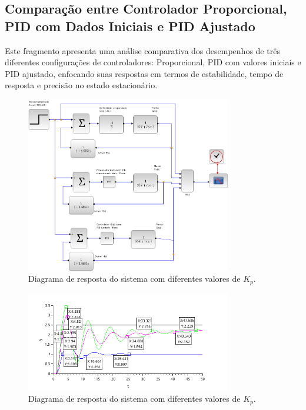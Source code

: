 \subsection{Comparação entre Controlador Proporcional, PID com Dados Iniciais e PID Ajustado}
Este fragmento apresenta uma análise comparativa dos desempenhos de três diferentes configurações de controladores: Proporcional, PID com valores iniciais e PID ajustado, enfocando suas respostas em termos de estabilidade, tempo de resposta e precisão no estado estacionário.



\begin{figure}[H]
    \centering
    \includegraphics[width=0.8\textwidth]{6-atividade/assets/d/diagrama-comparacao-proporcional-pid-pid-ajustado.png}
    \caption{Diagrama de resposta do sistema com diferentes valores de \( K_p \).}
    \label{fig:diagrama-comparacao-proporcional-pid-pid-ajustado}
\end{figure}

\begin{figure}[H]
    \centering
    \includegraphics[width=0.8\textwidth]{6-atividade/assets/d/comparacao-proporcional-pid-pid-ajustado.png}
    \caption{Diagrama de resposta do sistema com diferentes valores de \( K_p \).}
    \label{fig:comparacao-proporcional-pid-pid-ajustado}
\end{figure}


